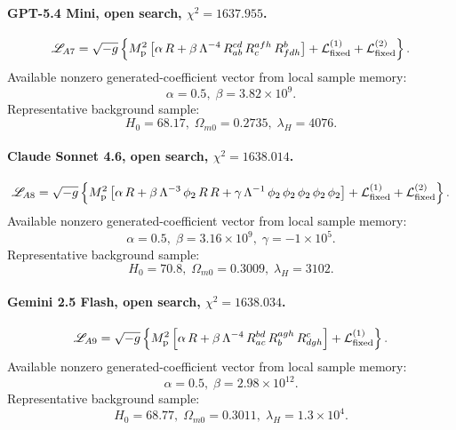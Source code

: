 \documentclass[aps,prd,twocolumn,superscriptaddress,nofootinbib,longbibliography]{revtex4-2}
\newcommand{\Mp}{M_{\rm p}}
\begin{document}
\begin{widetext}
\paragraph*{GPT-5.4 Mini, open search, $\chi^2=1637.955$.}
\begin{equation}
\begin{split}
\mathscr{L}_{A7}
=\sqrt{-g}\left\{\Mp^2\left[\alpha\,R + \beta\,\Lambda^{-4}\,R^{cd}_{ab} \, R^{afh}_{c} \, R^{b}_{fdh}\right] + \mathcal{L}_{\rm fixed}^{(1)} + \mathcal{L}_{\rm fixed}^{(2)}\right\}.
\end{split}
\end{equation}
Available nonzero generated-coefficient vector from local sample memory:
\begin{equation}
\alpha=0.5,\; \beta=3.82\times10^{9}.
\end{equation}
Representative background sample:
\begin{equation}
H_0=68.17,\; \Omega_{m0}=0.2735,\; \lambda_H=4076.
\end{equation}


\paragraph*{Claude Sonnet 4.6, open search, $\chi^2=1638.014$.}
\begin{equation}
\begin{split}
\mathscr{L}_{A8}
=\sqrt{-g}\left\{\Mp^2\left[\alpha\,R + \beta\,\Lambda^{-3}\,\phi_2 \, R \, R + \gamma\,\Lambda^{-1}\,\phi_2 \, \phi_2 \, \phi_2 \, \phi_2 \, \phi_2\right] + \mathcal{L}_{\rm fixed}^{(1)} + \mathcal{L}_{\rm fixed}^{(2)}\right\}.
\end{split}
\end{equation}
Available nonzero generated-coefficient vector from local sample memory:
\begin{equation}
\alpha=0.5,\; \beta=3.16\times10^{9},\; \gamma=-1\times10^{5}.
\end{equation}
Representative background sample:
\begin{equation}
H_0=70.8,\; \Omega_{m0}=0.3009,\; \lambda_H=3102.
\end{equation}


\paragraph*{Gemini 2.5 Flash, open search, $\chi^2=1638.034$.}
\begin{equation}
\begin{split}
\mathscr{L}_{A9}
=\sqrt{-g}\left\{\Mp^2\left[\alpha\,R + \beta\,\Lambda^{-4}\,R^{bd}_{ac} \, R^{agh}_{b} \, R^{c}_{dgh}\right] + \mathcal{L}_{\rm fixed}^{(1)}\right\}.
\end{split}
\end{equation}
Available nonzero generated-coefficient vector from local sample memory:
\begin{equation}
\alpha=0.5,\; \beta=2.98\times10^{12}.
\end{equation}
Representative background sample:
\begin{equation}
H_0=68.77,\; \Omega_{m0}=0.3011,\; \lambda_H=1.3\times10^{4}.
\end{equation}



\end{widetext}
\end{document}
